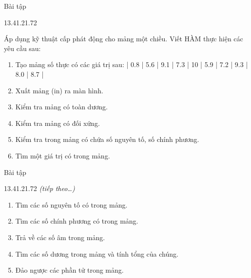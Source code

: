 \begin{frame}{Bài tập}
\begin{blk}{13.4}{1.2}{1.72}\fontsize{11.5}{13.8}\selectfont
{}\par
Áp dụng kỹ thuật cấp phát động cho mảng một chiều. Viết HÀM thực hiện các yêu cầu sau:
\begin{enumerate}[label=\arabic*.,leftmargin=1.55em,labelindent=0pt,labelsep=0.35em,align=left,itemsep=4pt]
\item Tạo mảng số thực có các giá trị sau: | 0.8 | 5.6 | 9.1 | 7.3 | 10 | 5.9 | 7.2 | 9.3 | 8.0 | 8.7 |
\item Xuất mảng (in) ra màn hình.
\item Kiểm tra mảng có toàn dương.
\item[6.] Kiểm tra mảng có đối xứng.
\item[7.] Kiểm tra trong mảng có chứa số nguyên tố, số chính phương.
\item[8.] Tìm một giá trị có trong mảng.
\end{enumerate}
\end{blk}
\end{frame}

\begin{frame}{Bài tập}
\begin{blk}{13.4}{1.2}{1.72}\fontsize{11.5}{13.8}\selectfont
{} \textit{(tiếp theo…)}\par\vspace{0.6cm}
\begin{enumerate}[label=\arabic*.,leftmargin=1.55em,labelindent=0pt,labelsep=0.35em,align=left,itemsep=4pt,start=9]
\item Tìm các số nguyên tố có trong mảng.
\item Tìm các số chính phương có trong mảng.
\item Trả về các số âm trong mảng.
\item Tìm các số dương trong mảng và tính tổng của chúng.
\item Đảo ngược các phần tử trong mảng.
\end{enumerate}
\end{blk}
\end{frame}

